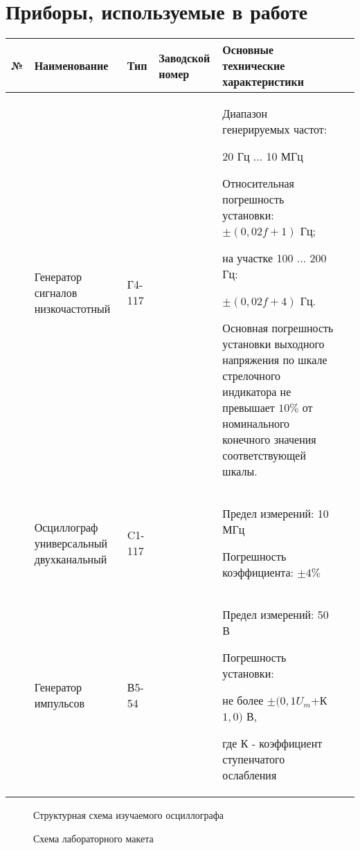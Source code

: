 \section{Приборы, используемые в работе}

\begin{center}
  \begin{longtable}{| m{0.5cm} | m{3cm} | m{1.5cm} | m{2cm} | m{8cm}l |}
  
  \hline
  \centering № & \centering Наименование &\centering Тип &\centering Заводской номер &\centering Основные технические характеристики & \\
  \hline
  \centering 1 &\centering Генератор сигналов низкочастотный &\centering Г4-117 &\centering &\centering
Диапазон генерируемых частот:\par 20 Гц $ ... $ 10 МГц\par
Относительная погрешность установки: $ \pm (0,02f + 1)$ Гц;\par
на участке 100 $ ... $ 200 Гц: \par $ \pm (0,02f+4) $ Гц.\par
Основная погрешность установки выходного напряжения по шкале стрелочного индикатора не превышает $ 10 \% $ от номинального конечного значения соответствующей шкалы. &  \\

	\hline
	\centering 2 &
	\centering Осциллограф универсальный двухканальный &
	\centering C1-117 &
	&
	\centering Предел измерений: 10 МГц \par Погрешность коэффициента: $ \pm4 \% $ &
	\\

  \hline
  \centering 3 &
  \centering Генератор импульсов &
  \centering В5-54 & 
  &
  \centering Предел измерений: 50 В \par Погрешность установки: \par не более $ \pm(0,1 U_{m}$+К $ 1,0) $ В, \par где К - коэффициент ступенчатого ослабления &
	\\
  
  \hline    
  
  \end{longtable}
\end{center}

\begin{figure}[htbp]
  \caption{Структурная схема изучаемого осциллографа}
\end{figure}

\begin{figure}[!h]
  \caption{Схема лабораторного макета}
\end{figure}

\clearpage

